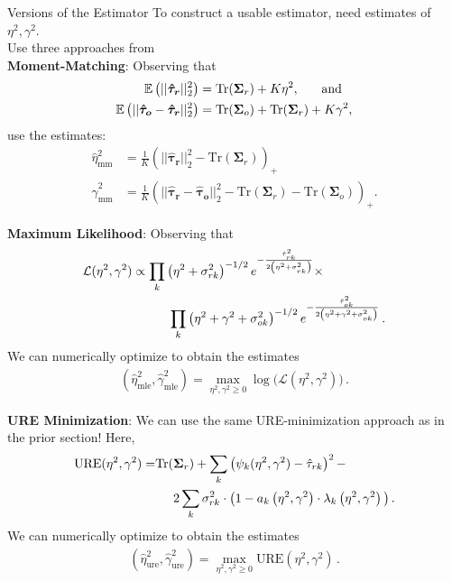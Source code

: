 \documentclass[usenames,dvipsnames]{beamer}
\newcommand{\bsSig}{\boldsymbol{\Sigma}}
\newcommand{\Tr}{\text{Tr}}
\newcommand{\E}{\mathbb{E}}
\newcommand{\tauu}{\boldsymbol{\hat \tau_r}}
\newcommand{\taub}{\boldsymbol{\hat \tau_o}}
\newcommand{\tauuk}{\hat \tau_{rk}}
\newcommand{\taubk}{\hat \tau_{ok}}
\newcommand{\gammamm}{\hat \gamma_{\text{mm}}^2}
\newcommand{\etamm}{\hat \eta_{\text{mm}}^2}
\newcommand{\gammamle}{\hat \gamma_{\text{mle}}^2}
\newcommand{\etamle}{\hat \eta_{\text{mle}}^2}
\newcommand{\ure}{\text{URE}}
\newcommand{\gammaure}{\hat \gamma_{\text{ure}}^2}
\newcommand{\etaure}{\hat \eta_{\text{ure}}^2}
\let\oldcite=\cite
\renewcommand{\cite}[1]{\textcolor[rgb]{.3,.3,.8}{\oldcite{#1}}}
\theoremstyle{definition} %
\begin{document}
\begin{frame}[allowframebreaks]{Versions of the Estimator}
To construct a usable estimator, need estimates of  $\eta^2, \gamma^2$. \\
Use three approaches from \cite{xie2012sure}\\  
\vspace{3mm}
\textbf{Moment-Matching}: Observing that 
\begin{align*}
\E \left( ||\tauu||_2^2 \right) &= \Tr(\bsSig_r) + K \eta^2, \hspace{5mm} \text{ and} \\
\E \left( || \taub - \tauu ||_2^2 \right) &=   \Tr(\bsSig_o) + \Tr(\bsSig_r) + K \gamma^2,
\end{align*}
use the estimates: 
\begin{align*}
\etamm &= \frac{1}{K} \left( ||\tauu||_2^2 - \Tr(\bsSig_r) \right)_+\\
\gammamm &= \frac{1}{K} \left( || \tauu - \taub ||_2^2 - \Tr(\bsSig_r) - \Tr(\bsSig_o) \right)_+.
\end{align*}

\pagebreak

\textbf{Maximum Likelihood}: Observing that 
\begin{align*}
\mathcal{L}(\eta^2, \gamma^2) &\propto \prod_k \left(\eta^2 + \sigma_{rk}^2 \right)^{-1/2} e^{-\frac{\tauuk^2}{2\left(\eta^2 + \sigma_{rk}^2 \right)}}\times \\ & \hspace{10mm} \prod_k  \left(\eta^2 + \gamma^2 + \sigma_{ok}^2 \right)^{-1/2} e^{-\frac{\taubk^2}{2\left(\eta^2 + \gamma^2 + \sigma_{ok}^2 \right)}} \,.
\end{align*}
We can numerically optimize to obtain the estimates
\begin{align*}
(\etamle, \gammamle) = \max_{\eta^2, \gamma^2 \geq 0} \log \bigg(\mathcal L (\eta^2, \gamma^2) \bigg)\,.
\end{align*}


\pagebreak

\textbf{URE Minimization}: We can use the same URE-minimization approach as in the prior section! Here, 
\begin{align*}
\ure(\eta^2,  \gamma^2) =&  \Tr ( \bsSig_r ) +  \sum_k \left( \psi_k(\eta^2, \gamma^2) - \hat \tau_{rk} \right)^2   - \\ & \hspace{5mm} 2\sum_k  \sigma_{rk}^2 \cdot \big(1 - a_k \left( \eta^2, \gamma^2 \right) \cdot \lambda_k \left( \eta^2,  \gamma^2 \right) \big)   \,.
\end{align*}
We can numerically optimize to obtain the estimates
\begin{align*}
(\etaure, \gammaure) = \max_{\eta^2, \gamma^2 \geq 0} \ure(\eta^2,  \gamma^2)\,.
\end{align*}


\end{frame}
\end{document}

